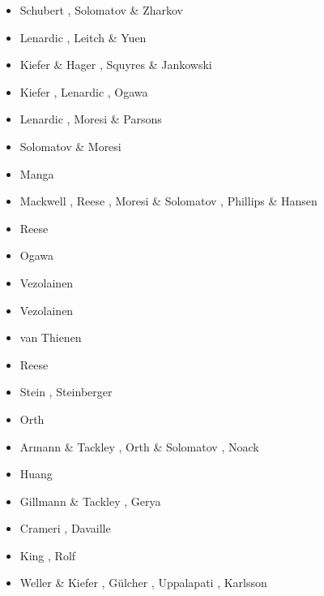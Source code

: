 \begin{itemize}
\begin{scriptsize}
\begin{itemize}
\item[\nineteenninety] Schubert \etal \cite{scbg90}, Solomatov \& Zharkov \cite{sozh90}
\item[\nineteenninetyone] Lenardic \etal \cite{lekb91}, Leitch \& Yuen \cite{leyu91}
\item[\nineteenninetytwo] Kiefer \& Hager \cite{kiha92}, Squyres \& Jankowski \cite{sqjs92}
\item[\nineteenninetythree] Kiefer \cite{kief93}, Lenardic \etal \cite{lekb93}, Ogawa \cite{ogaw93}
\item[\nineteenninetyfive] Lenardic \etal \cite{lekb95}, Moresi \& Parsons \cite{mopa95}
\item[\nineteenninetysix] Solomatov \& Moresi \cite{somo96}
\item[\nineteenninetyseven] Manga \cite{mang97} 
\item[\nineteenninetyeight] Mackwell \etal \cite{mazk98}, Reese \etal \cite{resm98},
                            Moresi \& Solomatov \cite{moso98}, Phillips \& Hansen \cite{phha98}
\item[\nineteenninetynine] Reese \etal \cite{resm99}
\item[\twothousand] Ogawa \cite{ogaw00} 
\item[\twothousandthree] Vezolainen \etal \cite{vesh03}
\item[\twothousandfour] Vezolainen \etal \cite{vesb04}
\item[\twothousandfive] van Thienen \etal \cite{vavv05}
\item[\twothousandseven] Reese \etal \cite{reso07}
\item[\twothousandten] Stein \etal \cite{stfh10}, Steinberger \etal \cite{stwt10}
\item[\twothousandeleven] Orth \etal \cite{orso11}
\item[\twothousandtwelve] Armann \& Tackley \cite{arta12}, Orth \& Solomatov \cite{orso12},
                          Noack \etal \cite{nobs12}
\item[\twothousandthirteen] Huang \etal \cite{huyz13}
\item[\twothousandfourteen] Gillmann \& Tackley \cite{gita14}, Gerya \cite{gery14b}
\item[\twothousandseventeen] Crameri \cite{cram17}, Davaille \etal \cite{dast17}
\item[\twothousandeighteen] King \cite{king18}, Rolf \etal \cite{ross18}
\item[\twothousandtwenty] Weller \& Kiefer \cite{weki20}, G{\"u}lcher \etal \cite{gugm20},
                          Uppalapati \etal \cite{uprc20}, Karlsson \etal \cite{kacc20}
\end{itemize}
\end{scriptsize}



\end{itemize}
